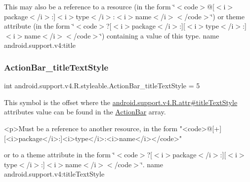 This may also be a reference to a resource (in the form \char`\"{}$<$code$>$@\mbox{[}$<$i$>$package$<$/i$>$\+:\mbox{]}$<$i$>$type$<$/i$>$\+:$<$i$>$name$<$/i$>$$<$/code$>$\char`\"{}) or theme attribute (in the form \char`\"{}$<$code$>$?\mbox{[}$<$i$>$package$<$/i$>$\+:\mbox{]}\mbox{[}$<$i$>$type$<$/i$>$\+:\mbox{]}$<$i$>$name$<$/i$>$$<$/code$>$\char`\"{}) containing a value of this type.  name android.\+support.\+v4\+:title \mbox{\label{classandroid_1_1support_1_1v4_1_1R_1_1styleable_a185298c5a3c99e803809f41a523be2a6}} 
\subsubsection{\texorpdfstring{Action\+Bar\+\_\+title\+Text\+Style}{ActionBar\_titleTextStyle}}
{\footnotesize\ttfamily int android.\+support.\+v4.\+R.\+styleable.\+Action\+Bar\+\_\+title\+Text\+Style = 5\hspace{0.3cm}{\ttfamily [static]}}

This symbol is the offset where the \hyperlink{classandroid_1_1support_1_1v4_1_1R_1_1attr_a504cda790d3f21fe9a084bf909d83e9a}{android.\+support.\+v4.\+R.\+attr\#title\+Text\+Style} attribute\textquotesingle{}s value can be found in the \hyperlink{classandroid_1_1support_1_1v4_1_1R_1_1styleable_adc5a3492b9c46265760d7120a04d6afa}{Action\+Bar} array.

\begin{DoxyVerb}      <p>Must be a reference to another resource, in the form "<code>@[+][<i>package</i>:]<i>type</i>:<i>name</i></code>"
\end{DoxyVerb}
 or to a theme attribute in the form \char`\"{}$<$code$>$?\mbox{[}$<$i$>$package$<$/i$>$\+:\mbox{]}\mbox{[}$<$i$>$type$<$/i$>$\+:\mbox{]}$<$i$>$name$<$/i$>$$<$/code$>$\char`\"{}.  name android.\+support.\+v4\+:title\+Text\+Style \mbox{\label{classandroid_1_1support_1_1v4_1_1R_1_1styleable_a37ea3f1caf51d0b0a3db37a7ec954040}} 
